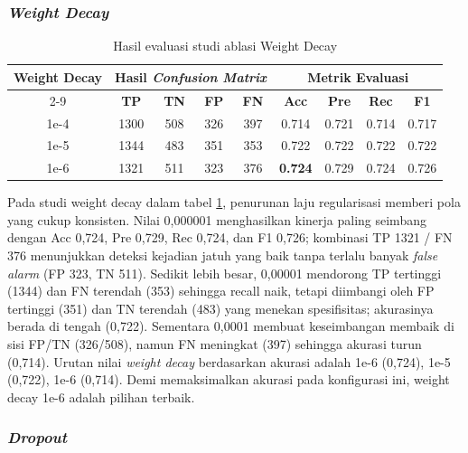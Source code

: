 \subsubsection{\textit{Weight Decay}} \label{IV.weight-decay}

\begin{table}[htbp]
    \centering
    \caption{Hasil evaluasi studi ablasi Weight Decay}
    \label{tab:ablasi Weight Decay}
    \begin{tabular}{|c|c|c|c|c|c|c|c|c|}
        \hline
        \multirow{2}{*}{\textbf{Weight Decay}} & \multicolumn{4}{c|}{\textbf{Hasil \textit{Confusion Matrix}}} & \multicolumn{4}{c|}{\textbf{Metrik Evaluasi}} \\ \cline{2-9}
         & \textbf{TP} & \textbf{TN} & \textbf{FP} & \textbf{FN} & \textbf{Acc} & \textbf{Pre} & \textbf{Rec} & \textbf{F1} \\ \hline
        1e-4 & 1300 & 508 & 326 & 397 & 0.714 & 0.721 & 0.714 & 0.717 \\ \hline
        1e-5 & 1344 & 483 & 351 & 353 & 0.722 & 0.722 & 0.722 & 0.722 \\ \hline
        1e-6 & 1321 & 511 & 323 & 376 & \textbf{0.724} & 0.729 & 0.724 & 0.726 \\ \hline
    \end{tabular}
\end{table}

Pada studi weight decay dalam tabel \ref{tab:ablasi Weight Decay}, penurunan laju regularisasi memberi pola yang cukup konsisten. Nilai 0,000001 menghasilkan kinerja paling seimbang dengan Acc 0,724, Pre 0,729, Rec 0,724, dan F1 0,726; kombinasi TP 1321 / FN 376 menunjukkan deteksi kejadian jatuh yang baik tanpa terlalu banyak \textit{false alarm} (FP 323, TN 511). Sedikit lebih besar, 0,00001 mendorong TP tertinggi (1344) dan FN terendah (353) sehingga recall naik, tetapi diimbangi oleh FP tertinggi (351) dan TN terendah (483) yang menekan spesifisitas; akurasinya berada di tengah (0,722). Sementara 0,0001 membuat keseimbangan membaik di sisi FP/TN (326/508), namun FN meningkat (397) sehingga akurasi turun (0,714). Urutan nilai \textit{weight decay} berdasarkan akurasi adalah 1e-6 (0,724), 1e-5 (0,722), 1e-6 (0,714). Demi memaksimalkan akurasi pada konfigurasi ini, weight decay 1e-6 adalah pilihan terbaik. \par

\subsubsection{\textit{Dropout}} \label{IV.dropout}

